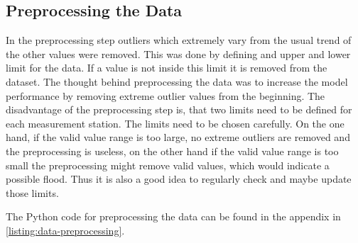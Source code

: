 \subsection{Preprocessing the Data}\label{subsection:data-preprocessing}
In the preprocessing step outliers which extremely vary from the usual trend of the other values were removed. This was done by defining and upper and lower limit for the data. If a value is not inside this limit it is removed from the dataset. The thought behind preprocessing the data was to increase the model performance by removing extreme outlier values from the beginning. The disadvantage of the preprocessing step is, that two limits need to be defined for each measurement station. The limits need to be chosen carefully. On the one hand, if the valid value range is too large, no extreme outliers are removed and the preprocessing is useless, on the other hand if the valid value range is too small the preprocessing might remove valid values, which would indicate a possible flood. Thus it is also a good idea to regularly check and maybe update those limits.
\par
The Python code for preprocessing the data can be found in the appendix in \autoref{listing:data-preprocessing}.

